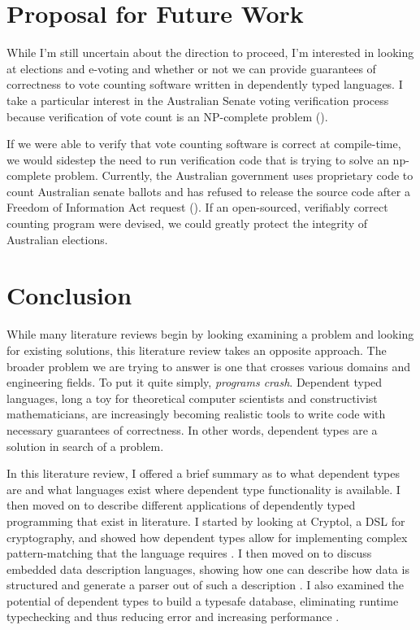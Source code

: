 \section{Proposal for Future Work}

While I'm still uncertain about the direction to proceed, I'm interested in
looking at elections and e-voting and whether or not we can provide guarantees
of correctness to vote counting software written in dependently typed languages.
I take a particular interest in the Australian Senate voting verification
process because verification of vote count is an NP-complete problem
(\cite{aus_senate}). 

If we were able to verify that vote counting software is correct at
compile-time, we would sidestep the need to run verification code that is trying
to solve an np-complete problem. Currently, the Australian government uses
proprietary code to count Australian senate ballots and has refused to release
the source code after a Freedom of Information Act request
(\cite{aus_senate_news}). If an open-sourced, verifiably correct counting
program were devised, we could greatly protect the integrity of Australian
elections. 

\section{Conclusion}
While many literature reviews begin by looking examining a problem and looking
for existing solutions, this literature review takes an opposite approach. The
broader problem we are trying to answer is one that crosses various domains and
engineering fields. To put it quite simply, \textit{programs crash}. Dependent
typed languages, long a toy for theoretical computer scientists and
constructivist mathematicians, are increasingly becoming realistic tools to
write code with necessary guarantees of correctness. In other words, dependent
types are a solution in search of a problem. 

In this literature review, I offered a brief summary as to what dependent types
are and what languages exist where dependent type functionality is available. I
then moved on to describe different applications of dependently typed
programming that exist in literature. I started by looking at Cryptol, a DSL for
cryptography, and showed how dependent types allow for implementing complex
pattern-matching that the language requires \cite{power_of_pi}. I then moved on
to discuss embedded data description languages, showing how one can describe how
data is structured and generate a parser out of such a description
\cite{power_of_pi}. I also examined the potential of dependent types to build a
typesafe database, eliminating runtime typechecking and thus reducing error and
increasing performance \cite{power_of_pi, eisenberg2016}. 

